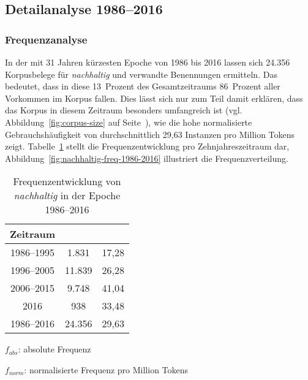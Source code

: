 \documentclass[
    german,
    a4paper,%
    12pt,%
    oneside,%
    toc=bibliography,
    final,
]{scrartcl}
\begin{document}
\subsection{Detailanalyse 1986–2016}
\label{subsec:detail-1986–2016}

\subsubsection{Frequenzanalyse}

In der mit 31 Jahren kürzesten Epoche von 1986 bis 2016 lassen sich 24.356 Korpusbelege für \textit{nachhaltig} und verwandte Benennungen ermitteln. Das bedeutet, dass in diese 13~Prozent des Gesamtzeitraums 86~Prozent aller Vorkommen im Korpus fallen. Dies lässt sich nur zum Teil damit erklären, dass das Korpus in diesem Zeitraum besonders umfangreich ist (vgl. Abbildung~\ref{fig:corpus-size} auf Seite~\pageref{fig:corpus-size}), wie die hohe normalisierte Gebrauchshäufigkeit von durchschnittlich 29,63 Instanzen pro Million Tokens zeigt. Tabelle~\ref{tab:freq-epoche4} stellt die Frequenzentwicklung pro Zehnjahreszeitraum dar, Abbildung~\ref{fig:nachhaltig-freq-1986-2016} illustriert die Frequenzverteilung.

\begin{table}[h!]
	\centering
	\renewcommand{\arraystretch}{1.5}
	
	\caption{Frequenzentwicklung von \textit{nachhaltig} in der Epoche 1986–2016}
	\label{tab:freq-epoche4}
	
	\begin{threeparttable}
	
	\begin{tabular}{ccc}
	\textbf{Zeitraum} & \boldmath{$f_{abs}$} & \boldmath{$f_{norm}$} \\ \hline
	1986–1995 & 1.831 & 17,28 \\ \hline
	1996–2005 & 11.839 & 26,28 \\ \hline
	2006–2015 & 9.748 & 41,04 \\ \hline
	2016 & 938 & 33,48 \\ \hline
	1986–2016 & 24.356 & 29,63 \\ \hline
	\end{tabular} 
	
	\begin{tablenotes}
	\footnotesize
	\setlength{\itemindent}{-1.2em}
	\item $f_{abs}$: absolute Frequenz
	\item $f_{norm}$: normalisierte Frequenz pro Million Tokens
	\end{tablenotes}
	
	\end{threeparttable}
\end{table}
\end{document}
